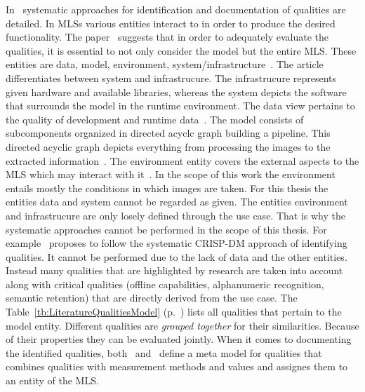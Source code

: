 In~\cite{nakamichi_requirements-driven_2020,siebert_construction_2021} systematic approaches for
identification and documentation of qualities are detailed.
In \acp{MLS} various entities interact to in order to produce the desired functionality.
The paper~\cite{nakamichi_requirements-driven_2020} suggests that in order to adequately evaluate
the qualities, it is essential to not only consider the model but the entire \ac{MLS}.
These entities are data, model, environment,
system/infrastructure~\citep{nakamichi_requirements-driven_2020, siebert_construction_2021}.
The article~\cite{siebert_construction_2021} differentiates between system and infrastrucure.
The infrastrucure represents given hardware and available libraries, whereas the system depicts
the software that surrounds the model in the runtime environment.
The data view pertains to the quality of development and runtime
data~\citep{siebert_construction_2021}.
The model consists of subcomponents organized in directed acyclc graph building a
pipeline.
This directed acyclic graph depicts everything from processing the images to the extracted
information~\citep{siebert_construction_2021}.
The environment entity covers the external aspects to the \ac{MLS} which may interact with
it~\citep{siebert_construction_2021}.
In the scope of this work the environment entails mostly the conditions in which images are taken.
For this thesis the entities data and system cannot be regarded as given.
The entities environment and infrastrucure are only losely defined through the use case.
That is why the systematic approaches cannot be performed in the scope of this thesis.
For example~\cite{siebert_construction_2021} proposes to follow the systematic CRISP-DM approach of
identifying qualities.
It cannot be performed due to the lack of data and the other entities.
Instead many qualities that are highlighted by research are taken into account along with critical
qualities (offline capabilities, alphanumeric recognition, semantic retention) that are directly
derived from the use case.
The Table~\ref{tb:LiteratureQualitiesModel} (p.~\pageref{tb:LiteratureQualitiesModel}) lists all
qualities that pertain to the model entity.
Different qualities are \textit{grouped together} for their similarities.
Because of their properties they can be evaluated jointly.
When it comes to documenting the identified qualities,
both~\cite{nakamichi_requirements-driven_2020} and~\cite{siebert_construction_2021} define a meta
model for qualities that combines qualities with
measurement methods and values and assignes them to an entity of the \ac{MLS}.
